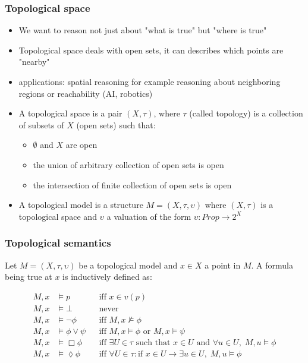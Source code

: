 \documentclass[hyperref={pdfpagelabels=false},t,10pt]{beamer}
\begin{document}
\begin{frame}
  \frametitle{Topological space}
  \begin{itemize}
    \item We want to reason not just about "what is true" but "where is true"
    \item Topological space deals with open sets, it can describes which points are "nearby"
    \pause
    \item applications: spatial reasoning for example reasoning about neighboring regions or reachability (AI, robotics)
    \pause
    \item A topological space is a pair $(X, \tau)$, where $\tau$ (called topology) is a collection of subsets of $X$ (open sets) such that: 
    \begin{itemize}
      \item $\emptyset$ and $X$ are open
      \item the union of arbitrary collection of open sets is open
      \item the intersection of finite collection of open sets is open
    \end{itemize}
    \item A topological model is a structure $M = (X,\tau, \upsilon)$ where $(X, \tau)$ is a topological space and $\upsilon$ a valuation of the form $\upsilon : Prop \rightarrow 2^X$ 
  \end{itemize}
\end{frame}

\begin{frame}
  \frametitle{Topological semantics}
  Let $M = (X, \tau, \upsilon)$ be a topological model and $x \in X$ a point in $M$. A formula being true at $x$ is inductively defined as:

  \[
\begin{aligned}
    M, x &\vDash p &&\text{iff } x \in v(p) \\
    M, x &\vDash \bot &&\text{never} \\
    M, x &\vDash \neg \phi &&\text{iff } M, x \nvDash \phi \\
    M, x &\vDash \phi \lor \psi &&\text{iff } M, x \vDash \phi \text{ or } M, x \vDash \psi \\
    M, x &\vDash \Box \phi &&\text{iff }\exists U \in \tau \text{ such that } x \in U \text{ and } \forall u \in U,\; M, u \vDash \phi \\
    M, x &\vDash \lozenge \phi &&\text{iff }\forall U \in \tau: \text{if }x \in U \rightarrow \exists u \in U,\; M, u \vDash \phi
\end{aligned}
\]

\end{frame}
\end{document}
